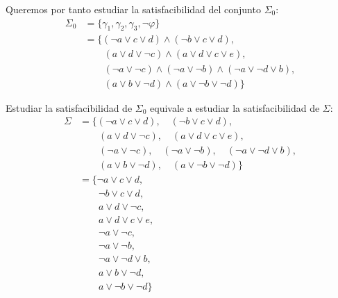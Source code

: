 \begin{ejercicio}
    Queremos por tanto estudiar la satisfacibilidad del conjunto $\Sigma_0$:
    \begin{align*}
        \Sigma_0 &= \{\gamma_1,\gamma_2,\gamma_3,\lnot \varphi\}\\
        &= \{(\lnot a\lor c\lor d)\land (\lnot b\lor c\lor d),\\
        &\qquad (a\lor d \lor \lnot c)\land (a\lor d\lor c\lor e),\\
        &\qquad (\lnot a\lor \lnot c) \land (\lnot a\lor \lnot b) \land (\lnot a\lor \lnot d\lor b),\\
        &\qquad (a\lor b\lor \lnot d)\land (a \lor \lnot b\lor \lnot d)\}
    \end{align*}

    Estudiar la satisfacibilidad de $\Sigma_0$ equivale a estudiar la satisfacibilidad de $\Sigma$:
    \begin{align*}
        \Sigma &= \{(\lnot a\lor c\lor d),\quad (\lnot b\lor c\lor d),\\
        &\qquad (a\lor d \lor \lnot c),\quad (a\lor d\lor c\lor e),\\
        &\qquad (\lnot a\lor \lnot c),\quad (\lnot a\lor \lnot b),\quad (\lnot a\lor \lnot d\lor b),\\
        &\qquad (a\lor b\lor \lnot d),\quad (a \lor \lnot b\lor \lnot d)\}\\
        &= \{\lnot a\lor c\lor d,\\
        &\qquad \lnot b\lor c\lor d,\\
        &\qquad a\lor d \lor \lnot c,\\
        &\qquad a\lor d\lor c\lor e,\\
        &\qquad \lnot a\lor \lnot c,\\
        &\qquad \lnot a\lor \lnot b,\\
        &\qquad \lnot a\lor \lnot d\lor b,\\
        &\qquad a\lor b\lor \lnot d,\\
        &\qquad a \lor \lnot b\lor \lnot d\}
    \end{align*}


\end{ejercicio}
